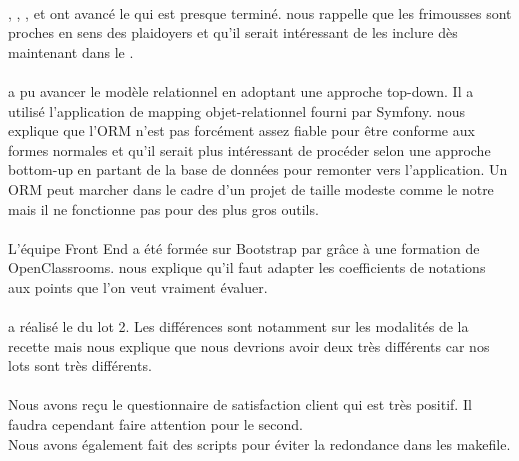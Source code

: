 \documentclass [a4paper] {article}
\begin{document}
\paragraph*{}
\Melissa, \Matthieu, \Michel, \Julie{} et \Florian{} ont avancé le \DCP{} qui est presque terminé. \nomTuteurPedago{} nous rappelle que les frimousses sont proches en sens des plaidoyers et qu'il serait intéressant de les inclure dès maintenant dans le \DCP{}.

\paragraph*{}
\Kafui{} a pu avancer le modèle relationnel en adoptant une approche top-down. Il a utilisé l'application de mapping objet-relationnel fourni par Symfony. \nomTuteurPedago{} nous explique que l'ORM n'est pas forcément assez fiable pour être conforme aux formes normales et qu'il serait plus intéressant de procéder selon une approche bottom-up en partant de la base de données pour remonter vers l'application. Un ORM peut marcher dans le cadre d'un projet de taille modeste comme le notre mais il ne fonctionne pas pour des plus gros outils.

\paragraph*{}
L'équipe Front End a été formée sur Bootstrap par \Matthieu{} grâce à une formation de OpenClassrooms. \nomTuteurPedago{} nous explique qu'il faut adapter les coefficients de notations aux points que l'on veut vraiment évaluer.

\paragraph*{}
\Michel{} a réalisé le \PTV{} du lot 2. Les différences sont notamment sur les modalités de la recette mais \nomTuteurPedago{} nous explique que nous devrions avoir deux \PTVCourt{} très différents car nos lots sont très différents.

\paragraph*{}
Nous avons reçu le questionnaire de satisfaction client qui est très positif. Il faudra cependant faire attention pour le second. \\
Nous avons également fait des scripts pour éviter la redondance dans les makefile.

\newpage
\end{document}
